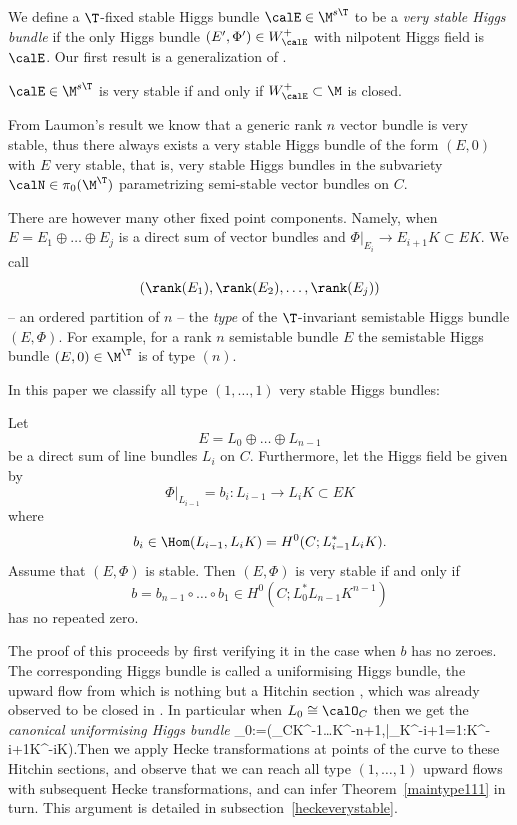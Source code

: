 We define a $\T$-fixed stable Higgs bundle $\calE\in \M^{s\T}$ to be a {\em very stable Higgs bundle} if the only Higgs bundle $(E^\prime,\Phi^\prime)\in W^+_\calE$ with nilpotent Higgs field is $\calE$.  Our first result is a generalization of \cite[Theorem 1.1]{pauly-peon-nieto}. \begin{theorem}\label{mainclosed}  $\calE\in \M^{s\T}$ is very stable if and only if $W^+_{\calE}\subset \M$ is closed.
\end{theorem}

From Laumon's result we know that a generic rank $n$ vector bundle is very stable, thus there always exists a very stable Higgs bundle of the form  $(E,0)$ with $E$ very stable, that is,  very stable Higgs  bundles in  the subvariety $\calN\in \pi_0(\M^\T)$ parametrizing semi-stable vector bundles on $C$.

There are however many other fixed point components. Namely, when  $E=E_1\oplus\dots \oplus E_j$ is a direct sum of vector bundles and $\Phi|_{E_i}\to E_{i+1}K\subset EK$. We call $$(\rank(E_1),\rank(E_2),\dots,\rank(E_j))$$ -- an ordered partition of $n$ -- the {\em type} of the $\T$-invariant semistable Higgs bundle $(E,\Phi)$. For example, for a rank $n$ semistable bundle $E$ the semistable Higgs bundle $(E,0)\in \M^\T$ is of type $(n)$.

In this paper we  classify all type $(1,\dots,1)$ very stable Higgs bundles:
\begin{theorem}
\notready \label{maintype111} Let $$E=L_0\oplus \dots \oplus L_{n-1}$$ be a direct sum of line bundles $L_i$ on $C$. Furthermore, let the Higgs field be given by $$\Phi|_{L_{i-1}}=b_i : L_{i-1}\to L_{i}K\subset EK$$ where $$b_i\in \Hom(L_{i-1},L_{i}K)=H^0(C;L_{i-1}^*L_{i}K).$$ Assume that $(E,\Phi)$ is stable. Then $(E,\Phi)$ is very stable if and only if $$b=b_{n-1}\circ \dots \circ b_1\in H^0(C;L_0^*L_{n-1}K^{n-1})$$ has no repeated zero.
\end{theorem}

The proof of this proceeds by first verifying it in the case when $b$ has no zeroes. The corresponding Higgs bundle is called a uniformising Higgs bundle, the upward flow from which is nothing but a Hitchin section \cite{hitchin-lie}, which was already observed to be closed  in \cite{hitchin-lie}. In particular when $L_0\cong \calO_C$ then we get the {\em canonical uniformising Higgs bundle} \beq\label{canuni} \calE_0:=(\calO_C\oplus K^{-1}\oplus \dots \oplus K^{-n+1},\Phi|_{K^{-i+1}}=1:K^{-i+1}\to K^{-i}\otimes K).\eeq Then we apply Hecke transformations  at points of the curve to these Hitchin sections, and observe that we can reach all type $(1,\dots,1)$ upward flows with subsequent Hecke transformations, and can infer Theorem~\ref{maintype111} in turn. This argument is detailed in subsection~\ref{heckeverystable}.

